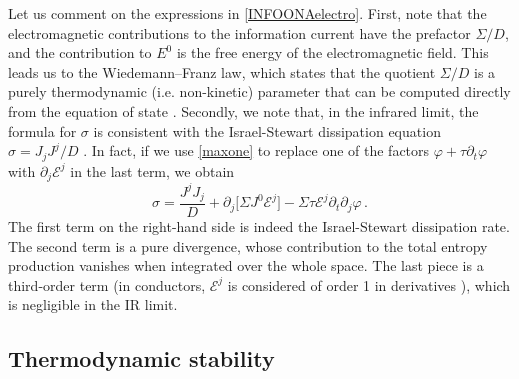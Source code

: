 \documentclass[a4paper, amsfonts, amssymb, amsmath, reprint, showkeys, nofootinbib, twoside,notitlepage,onecolumn,preprintnumbers]{revtex4-2}
\theoremstyle{definition}
\theoremstyle{theorem}
\theoremstyle{corollary}
\begin{document}
Let us comment on the expressions in \eqref{INFOONAelectro}. First, note that the electromagnetic contributions to the information current have the prefactor $\Sigma/D$, and the contribution to $E^0$ is the free energy of the electromagnetic field. This leads us to the Wiedemann–Franz law, which states that the quotient $\Sigma/D$ is a purely thermodynamic (i.e. non-kinetic) parameter that can be computed directly from the equation of state \cite{GavassinoMaxwell2023}. Secondly, we note that, in the infrared limit, the formula for $\sigma$ is consistent with the Israel-Stewart dissipation equation $\sigma=J_j J^j/D$ \cite{GavassinoMaxwell2023}. In fact, if we use \eqref{maxone} to replace one of the factors $\varphi +\tau \partial_t \varphi$ with $\partial_j \mathcal{E}^j$ in the last term, we obtain 
\begin{equation}
\sigma = \dfrac{J^j J_j}{D} +\partial_j \big[ \Sigma J^0 \mathcal{E}^j \big]-\Sigma \tau \mathcal{E}^j \partial_t \partial_j \varphi \, .
\end{equation}
The first term on the right-hand side is indeed the Israel-Stewart dissipation rate. The second term is a pure divergence, whose contribution to the total entropy production vanishes when integrated over the whole space. The last piece is a third-order term (in conductors, $\mathcal{E}^j$ is considered of order 1 in derivatives \cite{Hernandez:2017mch}), which is negligible in the IR limit.

\subsection{Thermodynamic stability}
\end{document}

